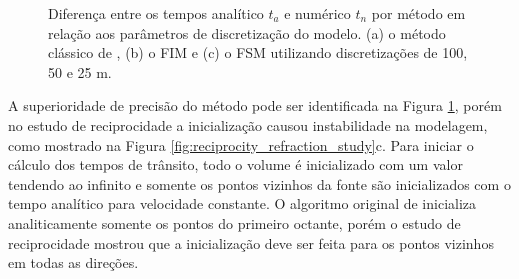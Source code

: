 \begin{figure}[H]
	\centering
	\newline
	\newline
	\newline
		
	\caption{Diferença entre os tempos analítico $t_a$ e numérico $t_n$ por método em relação aos parâmetros de discretização do modelo. (a) o método clássico de , (b) o FIM e (c) o FSM utilizando discretizações de 100, 50 e 25 m.}
	\label{fig:precision_refraction_study}	
\end{figure}

A superioridade de precisão do método  pode ser identificada na Figura \ref{fig:precision_refraction_study}, porém no estudo de reciprocidade a inicialização causou instabilidade na modelagem, como mostrado na Figura \ref{fig:reciprocity_refraction_study}c. Para iniciar o cálculo dos tempos de trânsito, todo o volume é inicializado com um valor tendendo ao infinito e somente os pontos vizinhos da fonte são inicializados com o tempo analítico para velocidade constante. O algoritmo original de  inicializa analiticamente somente os pontos do primeiro octante, porém o estudo de reciprocidade mostrou que a inicialização deve ser feita para os pontos vizinhos em todas as direções.  

